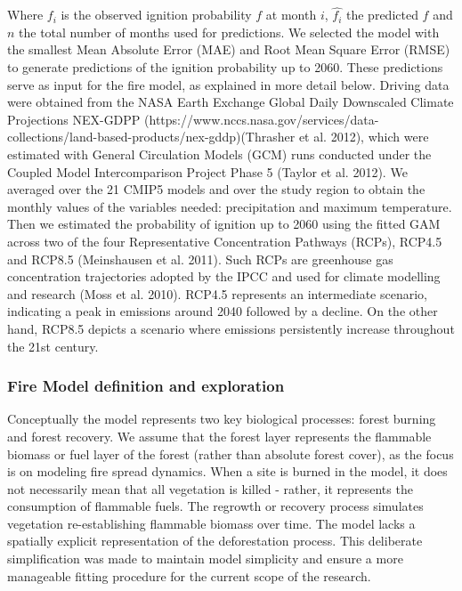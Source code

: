 \documentclass[
]{article}
\begin{document}
Where \(f_i\) is the observed ignition probability \(f\) at month \(i\),
\(\hat{f_i}\) the predicted \(f\) and \(n\) the total number of months
used for predictions. We selected the model with the smallest Mean
Absolute Error (MAE) and Root Mean Square Error (RMSE) to generate
predictions of the ignition probability up to 2060. These predictions
serve as input for the fire model, as explained in more detail below.
Driving data were obtained from the NASA Earth Exchange Global Daily
Downscaled Climate Projections NEX-GDPP
(https://www.nccs.nasa.gov/services/data-collections/land-based-products/nex-gddp)(Thrasher
et al. 2012), which were estimated with General Circulation Models (GCM)
runs conducted under the Coupled Model Intercomparison Project Phase 5
(Taylor et al. 2012). We averaged over the 21 CMIP5 models and over the
study region to obtain the monthly values of the variables needed:
precipitation and maximum temperature. Then we estimated the probability
of ignition up to 2060 using the fitted GAM across two of the four
Representative Concentration Pathways (RCPs), RCP4.5 and RCP8.5
(Meinshausen et al. 2011). Such RCPs are greenhouse gas concentration
trajectories adopted by the IPCC and used for climate modelling and
research (Moss et al. 2010). RCP4.5 represents an intermediate scenario,
indicating a peak in emissions around 2040 followed by a decline. On the
other hand, RCP8.5 depicts a scenario where emissions persistently
increase throughout the 21st century.

\subsubsection{Fire Model definition and
exploration}\label{fire-model-definition-and-exploration}

Conceptually the model represents two key biological processes: forest
burning and forest recovery. We assume that the forest layer represents
the flammable biomass or fuel layer of the forest (rather than absolute
forest cover), as the focus is on modeling fire spread dynamics. When a
site is burned in the model, it does not necessarily mean that all
vegetation is killed - rather, it represents the consumption of
flammable fuels. The regrowth or recovery process simulates vegetation
re-establishing flammable biomass over time. The model lacks a spatially
explicit representation of the deforestation process. This deliberate
simplification was made to maintain model simplicity and ensure a more
manageable fitting procedure for the current scope of the research.
\end{document}
